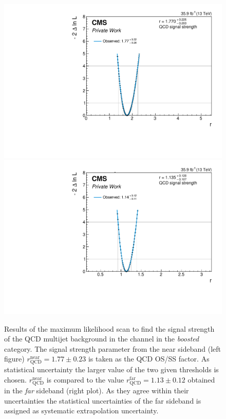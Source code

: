 \begin{figure}[h!]
    \centering
    \includegraphics[width=.49\textwidth]{Figures/background_estimation/RQCDOSSS/Scans/et_Boosted2D_antiiso_near/plots/nll.pdf}
    \includegraphics[width=.49\textwidth]{Figures/background_estimation/RQCDOSSS/Scans/et_Boosted2D_antiiso_far/plots/nll.pdf}
    \caption[Results of the maximum likelihood scan for $R_\text{QCD}^\text{OS/SS}$ in the \etau{} channel for the \textit{boosted} category.]{Results of the maximum likelihood scan to find the signal strength of the QCD multijet background in the \etau channel in the \textit{boosted} category.
    The signal strength parameter from the near sideband (left figure) $r^{\text{near}}_\text{QCD} = 1.77\pm 0.23$ is taken as the QCD OS/SS factor. As statistical uncertainty the larger value of the two given thresholds is chosen. 
    $r^{\text{near}}_\text{QCD}$ is compared to the value $r^{\text{far}}_\text{QCD} = 1.13\pm 0.12$ obtained in the \textit{far} sideband (right plot). As they agree within their uncertainties the statistical uncertainties of the far sideband is assigned as systematic extrapolation uncertainty.}\label{SUPPLE:BK:Scans:et_boosted}
\end{figure}

